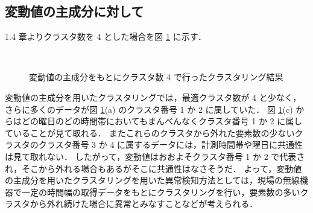 \documentclass[a4j]{jarticle}
\begin{document}
\subsection{変動値の主成分に対して}
1.4 章よりクラスタ数を 4 とした場合を図 \ref{diff} に示す．
\begin{figure}[tb]
\begin{center}
~
\\
\caption{変動値の主成分をもとにクラスタ数 4 で行ったクラスタリング結果}
\label{diff}
\end{center}
\end{figure}

変動値の主成分を用いたクラスタリングでは，最適クラスタ数が 4 と少なく，さらに多くのデータが図 \ref{diff}(a) のクラスタ番号 1 か 2 に属していた．
図 \ref{diff}(c) からはどの曜日のどの時間帯においてもまんべんなくクラスタ番号 1 か 2 に属していることが見て取れる．
またこれらのクラスタから外れた要素数の少ないクラスタのクラスタ番号 3 か 4 に属するデータには，計測時間帯や曜日に共通性は見て取れない．
したがって，変動値はおおよそクラスタ番号 1 か 2 で代表され，そこから外れる場合もあるがそこに共通性はなさそうだ．
よって，変動値の主成分を用いたクラスタリングを用いた異常検知方法としては，現場の無線機器で一定の時間幅の取得データをもとにクラスタリングを行い，要素数の多いクラスタから外れ続けた場合に異常とみなすことなどが考えられる．
\end{document}
